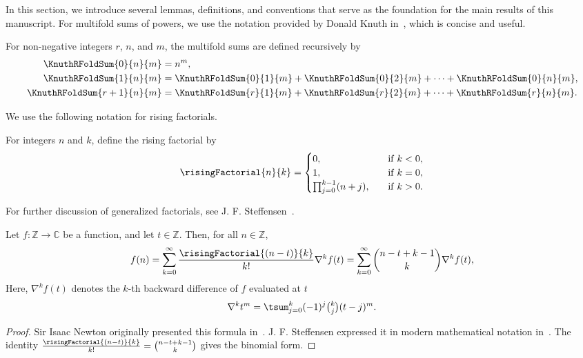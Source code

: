 In this section, we introduce several lemmas, definitions, and conventions
that serve as the foundation for the main results of this manuscript.
For multifold sums of powers, we use the notation provided by Donald Knuth in~\cite{knuth1993johann},
which is concise and useful.
\begin{definition} 
  \label{def:multifold-sums-of-powers-recurrence}
  For non-negative integers $r$, $n$, and $m$, the multifold sums are defined recursively by
  \begin{align*}
    \KnuthRFoldSum{0}{n}{m}   &= n^m, \\
    \KnuthRFoldSum{1}{n}{m}   &= \KnuthRFoldSum{0}{1}{m}
    + \KnuthRFoldSum{0}{2}{m} + \cdots + \KnuthRFoldSum{0}{n}{m}, \\
    \KnuthRFoldSum{r+1}{n}{m} &= \KnuthRFoldSum{r}{1}{m}
    + \KnuthRFoldSum{r}{2}{m} + \cdots + \KnuthRFoldSum{r}{n}{m}.
  \end{align*}
\end{definition}

We use the following notation for rising factorials.
\begin{definition}
  \label{def:rising-factorials}
  For integers $n$ and $k$, define the rising factorial by
  \begin{align*}
    \risingFactorial{n}{k} =
    \begin{cases}
      0, \quad & \mathrm{if \; } k < 0, \\
      1, \quad & \mathrm{if \; } k = 0, \\
      \prod_{j=0}^{k-1} (n+j), \quad & \mathrm{if \; } k>0.
    \end{cases}
  \end{align*}
\end{definition}
For further discussion of generalized factorials, see J. F. Steffensen~\cite{steffensen1933definition}.

\begin{lemma}
  \label{lem:backward-newtons-formula}
  Let $f\colon \mathbb{Z} \to \mathbb{C}$ be a function,
  and let $t \in \mathbb{Z}$.
  Then, for all $n \in \mathbb{Z}$,
  \begin{align*}
    f(n)
    = \sum_{k=0}^{\infty} \frac{\risingFactorial{(n-t)}{k}}{k!} \nabla^{k} f(t)
    = \sum_{k=0}^{\infty} \binom{n-t+k-1}{k} \nabla^{k} f(t),
  \end{align*}
  Here, $\nabla^{k} f(t)$ denotes the $k$-th backward difference of $f$
  evaluated at $t$
  \begin{align*}
    \nabla^{k} t^{m} = \tsum_{j=0}^{k} (-1)^j \tbinom{k}{j} (t-j)^m.
  \end{align*}
  \begin{proof}
    Sir Isaac Newton originally presented this formula in~\cite{newton1850newton}.
    J. F. Steffensen expressed it in modern mathematical notation in~\cite[Section 2, Equation (19)]{steffensen1927interpolation}.
    The identity
    $\frac{\risingFactorial{(n-t)}{k}}{k!} = \binom{n-t+k-1}{k}$
    gives the binomial form.
  \end{proof}
\end{lemma}

